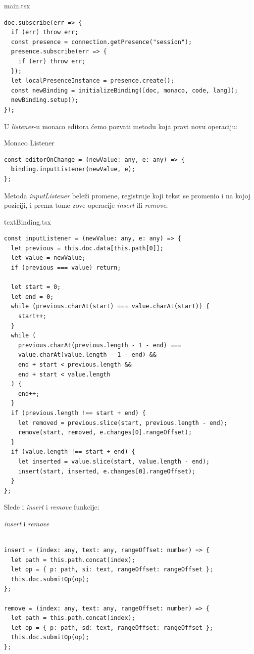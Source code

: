 \documentclass[12pt]{article}
\begin{document}
\begin{mylisting}[label={lst:example}]{main.tsx}
\begin{lstlisting}
doc.subscribe(err => {
  if (err) throw err;
  const presence = connection.getPresence("session");
  presence.subscribe(err => {
    if (err) throw err;
  });
  let localPresenceInstance = presence.create();
  const newBinding = initializeBinding([doc, monaco, code, lang]);
  newBinding.setup();
});
\end{lstlisting}
\end{mylisting}

U \textit{listener}-u monaco editora ćemo pozvati metodu koja pravi novu operaciju:

\begin{mylisting}[label={lst:example}]{Monaco Listener}
\begin{lstlisting}
const editorOnChange = (newValue: any, e: any) => {
  binding.inputListener(newValue, e);
};
\end{lstlisting}
\end{mylisting}

Metoda \textit{inputListener} beleži promene, registruje koji tekst se promenio i na kojoj poziciji, i prema tome zove operacije \textit{insert} ili \textit{remove}. 

\begin{mylisting}[label={lst:example}]{textBinding.tsx}
\begin{lstlisting}
const inputListener = (newValue: any, e: any) => {
  let previous = this.doc.data[this.path[0]];
  let value = newValue;
  if (previous === value) return;

  let start = 0;
  let end = 0;
  while (previous.charAt(start) === value.charAt(start)) {
    start++;
  }
  while (
    previous.charAt(previous.length - 1 - end) === 
    value.charAt(value.length - 1 - end) &&
    end + start < previous.length &&
    end + start < value.length
  ) {
    end++;
  }
  if (previous.length !== start + end) {
    let removed = previous.slice(start, previous.length - end);
    remove(start, removed, e.changes[0].rangeOffset);
  }
  if (value.length !== start + end) {
    let inserted = value.slice(start, value.length - end);
    insert(start, inserted, e.changes[0].rangeOffset);
  }
};
\end{lstlisting}
\end{mylisting}

Slede i \textit{insert} i \textit{remove} funkcije:

\begin{mylisting}[label={lst:example}]{\textit{insert} i \textit{remove}}
\begin{lstlisting}

insert = (index: any, text: any, rangeOffset: number) => {
  let path = this.path.concat(index);
  let op = { p: path, si: text, rangeOffset: rangeOffset };
  this.doc.submitOp(op);
};

remove = (index: any, text: any, rangeOffset: number) => {
  let path = this.path.concat(index);
  let op = { p: path, sd: text, rangeOffset: rangeOffset };
  this.doc.submitOp(op);
};
\end{lstlisting}
\end{mylisting}
\end{document}
